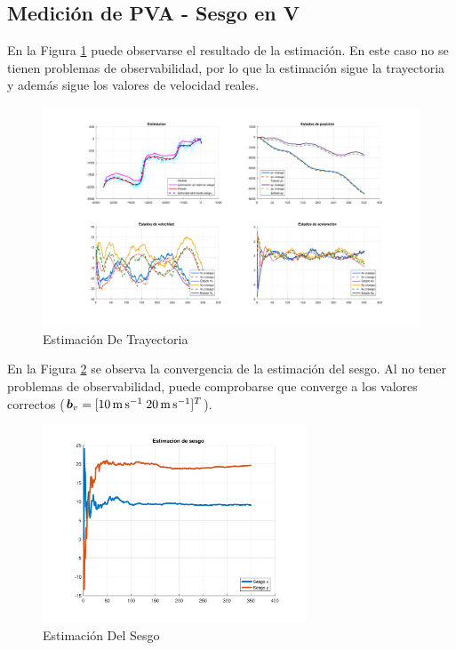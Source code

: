 \subsection{Medición de PVA - Sesgo en V}

	En la Figura \ref{fig:ej4d} puede observarse el resultado de la estimación. En este caso no se tienen problemas de observabilidad, por lo que la estimación sigue la trayectoria y además sigue los valores de velocidad reales.

	\begin{figure}[H]
		\centering
		\includegraphics[scale=0.5,trim={6,5cm 0 0 0}]{Figuras/graf_ej4d.pdf}
		\caption{Estimación De Trayectoria}
		\label{fig:ej4d}
	\end{figure}
	
	En la Figura \ref{fig:ej4d_bias} se observa la convergencia de la estimación del sesgo. Al no tener problemas de observabilidad, puede comprobarse que converge a los valores correctos ($\vect{b}_v = [\SI{10}{\m\per\s} \; \SI{20}{\m\per\s}]^T$).
	
	\begin{figure}[H]
		\centering
		\includegraphics[width=0.7\textwidth,keepaspectratio]{Figuras/bias_ej4d.pdf}
		\caption{Estimación Del Sesgo}
		\label{fig:ej4d_bias}
	\end{figure}
	
